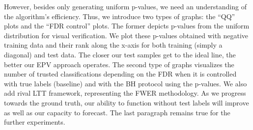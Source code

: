 \documentclass{article}
\begin{document}
However, besides only generating uniform p-values, we need an understanding of the algorithm’s efficiency. Thus, we introduce two types of graphs: the “QQ” plots and the “FDR control” plots. The former depicts p-values from the uniform distribution for visual verification. We plot these p-values obtained with negative training data and their rank along the x-axis for both training (simply a diagonal) and test data. The closer our test samples get to the ideal line, the better our EPV approach operates. The second type of graphs visualizes the number of trusted classifications depending on the FDR when it is controlled with true labels (baseline) and with the BH protocol using the p-values. We also add rival LTT framework, representing the FWER methodology. As we progress towards the ground truth, our ability to function without test labels will improve as well as our capacity to forecast. The last paragraph remains true for the further experiments.
\end{document}
